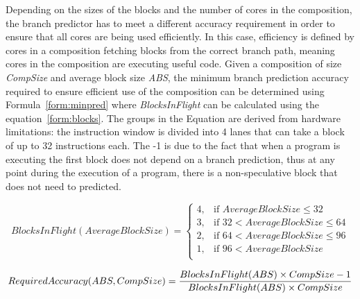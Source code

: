Depending on the sizes of the blocks and the number of cores in the composition, the branch predictor has to meet a different accuracy requirement in order to ensure that all cores are being used efficiently.
In this case, efficiency is defined by cores in a composition fetching blocks from the correct branch path, meaning cores in the composition are executing useful code.
Given a composition of size \textit{CompSize} and average block size \textit{ABS}, the minimum branch prediction accuracy required to ensure efficient use of the composition can be determined using Formula~\ref{form:minpred} where \textit{BlocksInFlight} can be calculated using the equation~\ref{form:blocks}.
The groups in the Equation are derived from hardware limitations: the instruction window is divided into 4 lanes that can take a block of up to 32 instructions each.
The -1 is due to the fact that when a program is executing the first block does not depend on a branch prediction, thus at any point during the execution of a program, there is a non-speculative block that does not need to predicted.

\begin{equation}\label{form:blocks}
BlocksInFlight(AverageBlockSize) = \begin{cases}
4, &\text{if } AverageBlockSize \le 32 \\
3, &\text{if } 32 < AverageBlockSize \le 64 \\
2, &\text{if } 64 < AverageBlockSize \le 96\\
1, &\text{if } 96 < AverageBlockSize\\
\end{cases}
\end{equation}

\begin{equation}\label{form:minpred}
RequiredAccuracy(ABS,CompSize)= \frac{BlocksInFlight(ABS) \times CompSize- 1}{BlocksInFlight(ABS) \times CompSize}
\vspace{1em}
\end{equation}


